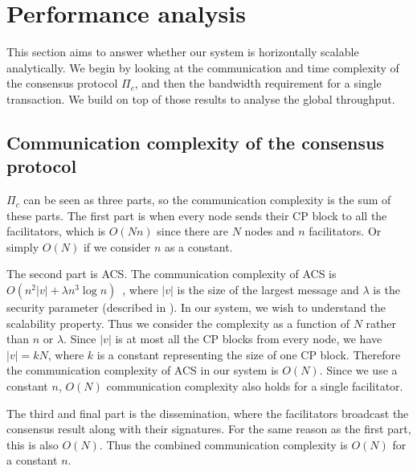 \section{Performance analysis}
\label{sec:performance-analysis}
This section aims to answer whether our system is horizontally scalable analytically.
We begin by looking at the communication and time complexity of the consensus protocol $\Pi_c$,
and then the bandwidth requirement for a single transaction.
We build on top of those results to analyse the global throughput.

\subsection{Communication complexity of the consensus protocol}
\label{sec:cons-complexity}
$\Pi_c$ can be seen as three parts,
so the communication complexity is the sum of these parts.
The first part is when every node sends their CP block to all the facilitators, which is $O(Nn)$ since there are $N$ nodes and $n$ facilitators.
Or simply $O(N)$ if we consider $n$ as a constant.

The second part is ACS.
The communication complexity of ACS is $O(n^2|v| + \lambda n^3 \log n)$~\cite{miller2016honey},
where $|v|$ is the size of the largest message and $\lambda$ is the security parameter (described in ).
In our system, we wish to understand the scalability property.
Thus we consider the complexity as a function of $N$ rather than $n$ or $\lambda$.
Since $|v|$ is at most all the CP blocks from every node, we have $|v| = kN$,
where $k$ is a constant representing the size of one CP block.
Therefore the communication complexity of ACS in our system is $O(N)$.
Since we use a constant $n$, $O(N)$ communication complexity also holds for a single facilitator.

The third and final part is the dissemination, where the facilitators broadcast the consensus result along with their signatures.
For the same reason as the first part, this is also $O(N)$.
Thus the combined communication complexity is $O(N)$ for a constant $n$.


